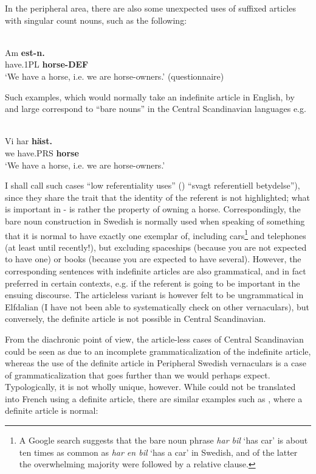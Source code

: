 In the peripheral area, there are also some unexpected uses of suffixed articles with singular count nouns, such as the following:

\ea \label{} 
\\
\gll Am  \textbf{est-n.}\\
have.1PL  \textbf{horse-DEF}\\
\glt ‘We have a horse, i.e. we are horse-owners.’ (questionnaire)

\z

Such examples, which would normally take an indefinite article in English, by and large correspond to “bare nouns” in the Central Scandinavian languages e.g.

\ea \label{} 
\\
\gll Vi  har  \textbf{häst.}\\
we  have.PRS  \textbf{horse}\\
\glt ‘We have a horse, i.e. we are horse-owners.’

\z

I shall call such cases “low referentiality uses” (\citet[3:56]{TelemanEtAl1999}) “svagt referentiell betydelse”), since they share the trait that the identity of the referent is not highlighted; what is important in - is rather the property of owning a horse. Correspondingly, the bare noun construction in Swedish is normally used when speaking of something that it is normal to have exactly one exemplar of, including cars\footnote{ A Google search suggests that the bare noun phrase \textit{har bil} ‘has car’ is about ten times as common as \textit{har en bil} ‘has a car’ in Swedish, and of the latter the overwhelming majority were followed by a relative clause. } and telephones (at least until recently!), but excluding spaceships (because you are not expected to have one) or books (because you are expected to have several). However, the corresponding sentences with indefinite articles are also grammatical, and in fact preferred in certain contexts, e.g. if the referent is going to be important in the ensuing discourse. The articleless variant is however felt to be ungrammatical in Elfdalian (I have not been able to systematically check on other vernaculars), but conversely, the definite article is not possible in Central Scandinavian. 

From the diachronic point of view, the article-less cases of Central Scandinavian could be seen as due to an incomplete grammaticalization of the indefinite article, whereas the use of the definite article in Peripheral Swedish vernaculars is a case of grammaticalization that goes further than we would perhaps expect. Typologically, it is not wholly unique, however. While  could not be translated into French using a definite article, there are similar examples such as , where a definite article is normal:


